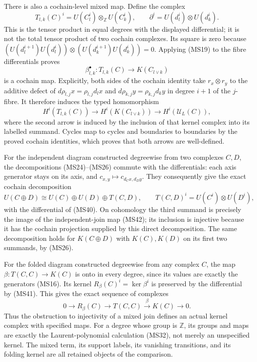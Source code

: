 \documentclass[
]{article}
\begin{document}
There is also a cochain-level mixed map. Define the complex \[
T_{l,k}(C)^i=U(C_l^i)\otimes_{\mathbb Z}U(C_k^i),\qquad
\partial^i=U(d_l^i)\otimes U(d_k^i).
\tag{MS40}
\] This is the tensor product in equal degrees with the displayed
differential; it is not the total tensor product of two cochain
complexes. Its square is zero because
\((U(d_l^{i+1})U(d_l^i))\otimes(U(d_k^{i+1})U(d_k^i))=0\). Applying
(MS19) to the fibre differentials proves \[
\beta_{l,k}^\bullet:T_{l,k}(C)\longrightarrow K(C_{l\vee k})
\tag{MS41}
\] is a cochain map. Explicitly, both sides of the cochain identity take
\(r_x\otimes r_y\) to the additive defect of
\(d\rho_{l,j}x=\rho_{l,j}d_lx\) and \(d\rho_{k,j}y=\rho_{k,j}d_ky\) in
degree \(i+1\) of the \(j\)-fibre. It therefore induces the typed
homomorphism \[
H^i(T_{l,k}(C))\longrightarrow H^i(K(C_{l\vee k}))
\longrightarrow H^i(\mathscr U_L(C)),
\tag{MS42}
\] where the second arrow is induced by the inclusion of that kernel
complex into its labelled summand. Cycles map to cycles and boundaries
to boundaries by the proved cochain identities, which proves that both
arrows are well-defined.

For the independent diagram constructed degreewise from two complexes
\(C,D\), the decompositions (MS24)--(MS26) commute with the
differentials: each axis generator stays on its axis, and
\(c_{x,y}\mapsto c_{d_Cx,d_Dy}\). They consequently give the exact
cochain decomposition \[
U(C\oplus D)
\cong U(C)\oplus U(D)\oplus T(C,D),
\qquad T(C,D)^i=U(C^i)\otimes U(D^i),
\tag{MS43}
\] with the differential of (MS40). On cohomology the third summand is
precisely the image of the independent-join map (MS42); its inclusion is
injective because it has the cochain projection supplied by this direct
decomposition. The same decomposition holds for \(K(C\oplus D)\) with
\(K(C),K(D)\) on its first two summands, by (MS26).

For the folded diagram constructed degreewise from any complex \(C\),
the map \(\beta:T(C,C)\to K(C)\) is onto in every degree, since its
values are exactly the generators (MS16). Its kernel
\(R_\beta(C)^i=\ker\beta^i\) is preserved by the differential by (MS41).
This gives the exact sequence of complexes \[
0\longrightarrow R_\beta(C)
\longrightarrow T(C,C)
\xrightarrow{\ \beta\ }K(C)
\longrightarrow0.
\tag{MS44}
\] Thus the obstruction to injectivity of a mixed join defines an actual
kernel complex with specified maps. For a degree whose group is
\(\mathbb Z\), its groups and maps are exactly the Laurent-polynomial
calculation (MS32), not merely an unspecified kernel. The mixed term,
its support labels, its vanishing transitions, and its folding kernel
are all retained objects of the comparison.
\end{document}
